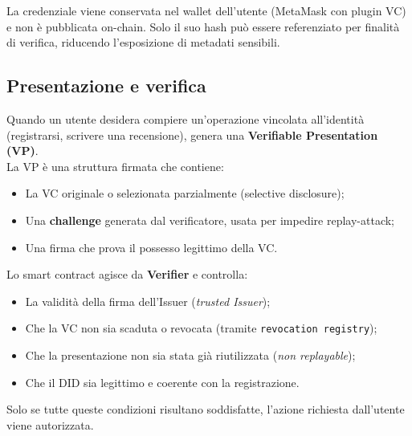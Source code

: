             \noindent La credenziale viene conservata nel wallet dell'utente (MetaMask con plugin VC) e non è pubblicata on-chain. Solo il suo hash può essere referenziato per finalità di verifica, riducendo l'esposizione di metadati sensibili.

        \subsection{Presentazione e verifica}
            Quando un utente desidera compiere un'operazione vincolata all'identità (registrarsi, scrivere una recensione), genera una \textbf{Verifiable Presentation (VP)}. \\
            La VP è una struttura firmata che contiene:
                \begin{itemize}
                    \item La VC originale o selezionata parzialmente (selective disclosure);
                    
                    \item Una \textbf{challenge} generata dal verificatore, usata per impedire replay-attack;
                    
                    \item Una firma che prova il possesso legittimo della VC.
                \end{itemize}
            
            \noindent Lo smart contract agisce da \textbf{Verifier} e controlla:
                \begin{itemize}
                    \item La validità della firma dell'Issuer (\textit{trusted Issuer});
                    
                    \item Che la VC non sia scaduta o revocata (tramite \texttt{revocation registry});
                    
                    \item Che la presentazione non sia stata già riutilizzata (\textit{non replayable});
                    
                    \item Che il DID sia legittimo e coerente con la registrazione.
                \end{itemize}

            \noindent Solo se tutte queste condizioni risultano soddisfatte, l'azione richiesta dall'utente viene autorizzata.

